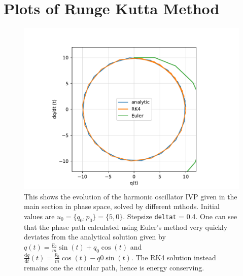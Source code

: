 \section{Plots of Runge Kutta Method}

\begin{figure}[H]
  \includegraphics[width=\textwidth]{../python/rungekutta/plot-phasepath.pdf}
  \caption{This shows the evolution of the harmonic oscillator IVP given in the main section in phase space, solved by different mthods. Initial values are $u_0 = \{q_0, p_0\} = \{5, 0\} $. Stepsize \lstinline{deltat} = 0.4. One can see that the phase path calculated using Euler's method very quickly deviates from the analytical solution given by $ q(t) = \tfrac{p_0}{m}  \sin(t) + q_0 \cos(t)$ and $\tfrac{\mathrm{d}q}{\mathrm{d}t}(t) = \tfrac{p_0}{m} \cos(t) - q0 \sin(t)$. The RK4 solution instead remains one the circular path, hence is energy conserving.}
\end{figure}
